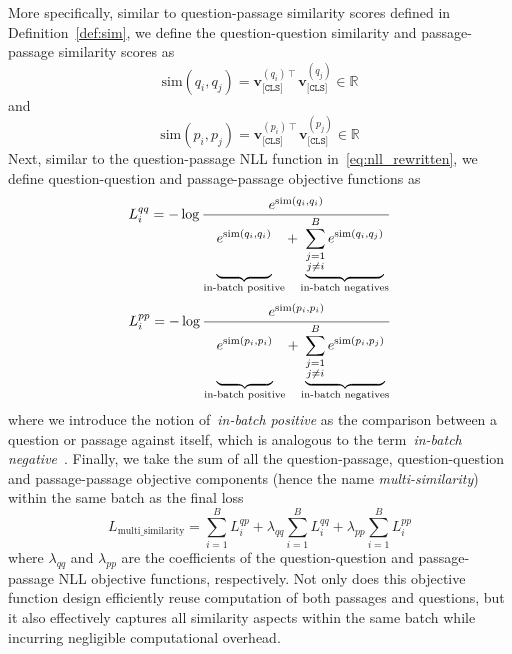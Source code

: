 %
More specifically, similar to question-passage similarity scores defined in Definition~\ref{def:sim}, we define the question-question similarity and passage-passage similarity scores as
%
\begin{equation}
\text{sim}(q_i, q_j) = \mathbf{v}^{(q_i)\intercal}_{\texttt{[CLS]}} \mathbf{v}^{(q_j)}_{\texttt{[CLS]}} \in \mathbb{R}
\end{equation}
%
and
%
\begin{equation}
\text{sim}(p_i, p_j) = \mathbf{v}^{(p_i)\intercal}_{\texttt{[CLS]}} \mathbf{v}^{(p_j)}_{\texttt{[CLS]}} \in \mathbb{R}
\end{equation}
%
Next, similar to the question-passage NLL function in~\eqref{eq:nll_rewritten}, we define question-question and passage-passage objective functions as
%
\begin{equation}
L^{qq}_i = - \log \frac{e^{\text{sim}(q_i, q_i)}}{
	\underbrace{
		\vphantom{\sum_{\substack{j = 1 \\ j \neq i}}^{B} e^{\text{sim}(q_i, q_j)}}
		e^{\text{sim}(q_i, q_i)}
	}_{\text{in-batch positive}} +
	\underbrace{
		\sum_{\substack{j = 1 \\ j \neq i}}^{B} e^{\text{sim}(q_i, q_j)}
	}_{\text{in-batch negatives}}
}
\end{equation}
%
\begin{equation}
%
L^{pp}_i = - \log \frac{e^{\text{sim}(p_i, p_i)}}{
	\underbrace{
		\vphantom{\sum_{\substack{j = 1 \\ j \neq i}}^{B} e^{\text{sim}(p_i, p_j)}}
		e^{\text{sim}(p_i, p_i)}
	}_{\text{in-batch positive}} +
	\underbrace{
		\sum_{\substack{j = 1 \\ j \neq i}}^{B} e^{\text{sim}(p_i, p_j)}
	}_{\text{in-batch negatives}}
}
\end{equation}
%
where we introduce the notion of~\emph{in-batch positive} as the comparison between a question or passage against itself, which is analogous to the term~\emph{in-batch negative}~\cite{karpukhin2020dense}.
%
Finally, we take the sum of all the question-passage, question-question and passage-passage objective components (hence the name \emph{multi-similarity}) within the same batch as the final loss
%
\begin{equation}
%
L_{\text{multi\_similarity}} = \sum_{i = 1}^{B} L^{qp}_i + \lambda_{qq} \sum_{i = 1}^{B} L^{qq}_i + \lambda_{pp} \sum_{i = 1}^{B} L^{pp}_i
\end{equation}
%
where $\lambda_{qq}$ and $\lambda_{pp}$ are the coefficients of the question-question and passage-passage NLL objective functions, respectively.
%
Not only does this objective function design efficiently reuse computation of both passages and questions, but it also effectively captures all similarity aspects within the same batch while incurring negligible computational overhead.


